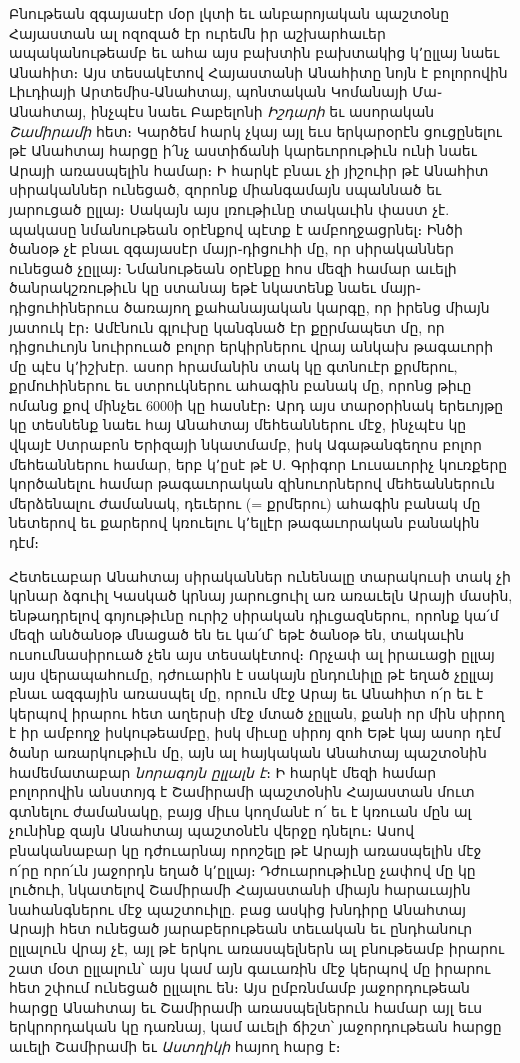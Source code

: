 \documentclass{article}
\begin{document}
{Բնութեան զգայասէր մօր լկտի եւ անբարոյական պաշտօնը Հայաստան ալ ոզոզած էր ուրեմն իր աշխարհաւեր ապականութեամբ եւ ահա այս բախտին բախտակից կ՚ըլլայ նաեւ Անահիտ։ Այս տեսակէտով Հայաստանի Անահիտը նոյն է բոլորովին Լիւդիայի Արտեմիս֊Անահտայ, պոնտական Կոմանայի Մա֊Անահտայ, ինչպէս նաեւ Բաբելոնի \emph{Իշդարի} եւ ասորական \emph{Շամիրամի} հետ։ Կարծեմ հարկ չկայ այլ եւս երկարօրէն ցուցընելու թէ Անահտայ հարցը ի՛նչ աստիճանի կարեւորութիւն ունի նաեւ Արայի առասպելին համար։ Ի հարկէ բնաւ չի յիշուիր թէ Անահիտ սիրականներ ունեցած, զորոնք միանգամայն սպաննած եւ յարուցած ըլլայ։ Սակայն այս լռութիւնը տակաւին փաստ չէ. պակասը նմանութեան օրէնքով պէտք է ամբողջացրնել։ Ինծի ծանօթ չէ բնաւ զգայասէր մայր֊դիցուհի մը, որ սիրականներ ունեցած չըլլայ։ Նմանութեան օրէնքը հոս մեզի համար աւելի ծանրակշռութիւն կը ստանայ եթէ նկատենք նաեւ մայր֊դիցուհիներուս ծառայող քահանայական կարգը, որ իրենց միայն յատուկ էր։ Ամէնուն գլուխը կանգնած էր քըրմապետ մը, որ դիցուհւոյն նուիրուած բոլոր երկիրներու վրայ անկախ թագաւորի մը պէս կ՚իշխէր. ասոր հրամանին տակ կը գտնուէր քրմերու, քրմուհիներու եւ ստրուկներու ահագին բանակ մը, որոնց թիւը ոմանց քով մինչեւ 6000ի կը հասնէր։ Արդ այս տարօրինակ երեւոյթը կը տեսնենք նաեւ հայ Անահտայ մեհեաններու մէջ, ինչպէս կը վկայէ Ստրաբոն Երիզայի նկատմամբ, իսկ Ագաթանգեղոս բոլոր մեհեաններու համար, երբ կ՚ըսէ թէ Ս. Գրիգոր Լուսաւորիչ կուռքերը կործանելու համար թագաւորական զինուորներով մեհեաններուն մերձենալու ժամանակ, դեւերու (= քրմերու) ահագին բանակ մը նետերով եւ քարերով կռուելու կ՚ելլէր թագաւորական բանակին դէմ։

Հետեւաբար Անահտայ սիրականներ ունենալը տարակուսի տակ չի կրնար ձգուիլ Կասկած կրնայ յարուցուիլ առ առաւելն Արայի մասին, ենթադրելով գոյութիւնը ուրիշ սիրական դիւցազներու, որոնք կա՛մ մեզի անծանօթ մնացած են եւ կա՛մ՝ եթէ ծանօթ են, տակաւին ուսումնասիրուած չեն այս տեսակէտով։ Որչափ ալ իրաւացի ըլլայ այս վերապահումը, դժուարին է սակայն ընդունիլը թէ եղած չըլլայ բնաւ ազգային առասպել մը, որուն մէջ Արայ եւ Անահիտ ո՛ր եւ է կերպով իրարու հետ աղերսի մէջ մտած չըլլան, քանի որ մին սիրող է իր ամբողջ իսկութեամբը, իսկ միւսը սիրոյ զոհ Եթէ կայ ասոր դէմ ծանր առարկութիւն մը, այն ալ հայկական Անահտայ պաշտօնին համեմատաբար \emph{նորագոյն ըլլալն է}։ Ի հարկէ մեզի համար բոլորովին անստոյգ է Շամիրամի պաշտօնին Հայաստան մուտ գտնելու ժամանակը, բայց միւս կողմանէ ո՛ եւ է կռուան մըն ալ չունինք զայն Անահտայ պաշտօնէն վերջը դնելու։ Ասով բնականաբար կը դժուարնայ որոշելը թէ Արայի առասպելին մէջ ո՛րը որո՛ւն յաջորդն եղած կ՚ըլլայ։ Դժուարութիւնը չափով մը կը լուծուի, նկատելով Շամիրամի Հայաստանի միայն հարաւային նահանգներու մէջ պաշտուիլը. բաց ասկից խնդիրը Անահտայ Արայի հետ ունեցած յարաբերութեան տեւական եւ ընդհանուր ըլլալուն վրայ չէ, այլ թէ երկու առասպելներն ալ բնութեամբ իրարու շատ մօտ ըլլալուն՝ այս կամ այն գաւառին մէջ կերպով մը իրարու հետ շփում ունեցած ըլլալու են։ Այս ըմբռնմամբ յաջորդութեան հարցը Անահտայ եւ Շամիրամի առասպելներուն համար այլ եւս երկրորդական կը դառնայ, կամ աւելի ճիշտ՝ յաջորդութեան հարցը աւելի Շամիրամի եւ \emph{Աստղիկի} հայող հարց է։

}
\end{document}
